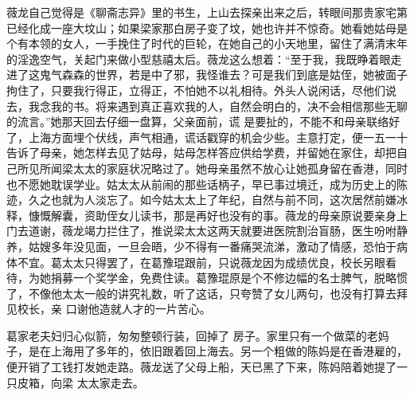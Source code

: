 \documentclass{article}
\begin{document}
薇龙自己觉得是《聊斋志异》里的书生，上山去探亲出来之后，转眼间那贵家宅第已经化成一座大坟山；如果梁家那白房子变了坟，她也许并不惊奇。她看她姑母是个有本领的女人，一手挽住了时代的巨轮，在她自己的小天地里，留住了满清末年的淫逸空气，关起门来做小型慈禧太后。薇龙这么想着：“至于我，我既睁着眼走进了这鬼气森森的世界，若是中了邪，我怪谁去？可是我们到底是姑侄，她被面子拘住了，只要我行得正，立得正，不怕她不以礼相待。外头人说闲话，尽他们说去，我念我的书。将来遇到真正喜欢我的人，自然会明白的，决不会相信那些无聊的流言。”她那天回去仔细一盘算，父亲面前，谎
\newpage
是要扯的，不能不和母亲联络好了，上海方面埋个伏线，声气相通，谎话戳穿的机会少些。主意打定，便一五一十告诉了母亲，她怎样去见了姑母，姑母怎样答应供给学费，并留她在家住，却把自己所见所闻梁太太的家庭状况略过了。她母亲虽然不放心让她孤身留在香港，同时也不愿她耽误学业。姑太太从前闹的那些话柄子，早已事过境迁，成为历史上的陈迹，久之也就为人淡忘了。如今姑太太上了年纪，自然与前不同，这次居然前嫌冰释，慷慨解囊，资助侄女儿读书，那是再好也没有的事。薇龙的母亲原说要亲身上门去道谢，薇龙竭力拦住了，推说梁太太这两天就要进医院割治盲肠，医生吩咐静养，姑嫂多年没见面，一旦会晤，少不得有一番痛哭流涕，激动了情感，恐怕于病体不宜。葛太太只得罢了，在葛豫琨跟前，只说薇龙因为成绩优良，校长另眼看待，为她捐募一个奖学金，免费住读。葛豫琨原是个不修边幅的名士脾气，脱略惯了，不像他太太一般的讲究礼数，听了这话，只夸赞了女儿两句，也没有打算去拜见校长，亲
口谢他造就人才的一片苦心。 

葛家老夫妇归心似箭，匆匆整顿行装，回掉了
\newpage
房子。家里只有一个做菜的老妈子，是在上海用了多年的，依旧跟着回上海去。另一个粗做的陈妈是在香港雇的，便开销了工钱打发她走路。薇龙送了父母上船，天已黑了下来，陈妈陪着她提了一只皮箱，向梁
太太家走去。 
\end{document}
